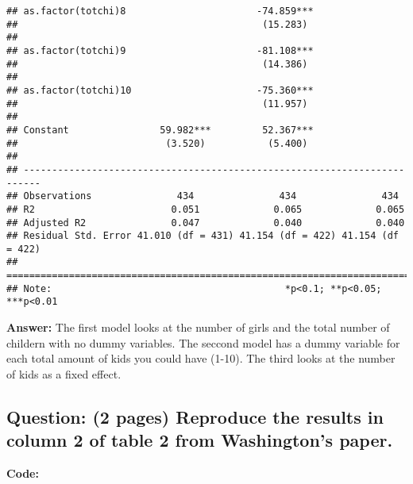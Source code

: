 \documentclass[
]{article}
\begin{document}
\begin{verbatim}
## as.factor(totchi)8                       -74.859***                      
##                                           (15.283)                       
##                                                                          
## as.factor(totchi)9                       -81.108***                      
##                                           (14.386)                       
##                                                                          
## as.factor(totchi)10                      -75.360***                      
##                                           (11.957)                       
##                                                                          
## Constant                59.982***         52.367***                      
##                          (3.520)           (5.400)                       
##                                                                          
## -------------------------------------------------------------------------
## Observations               434               434               434       
## R2                        0.051             0.065             0.065      
## Adjusted R2               0.047             0.040             0.040      
## Residual Std. Error 41.010 (df = 431) 41.154 (df = 422) 41.154 (df = 422)
## =========================================================================
## Note:                                         *p<0.1; **p<0.05; ***p<0.01
\end{verbatim}

\textbf{Answer:} The first model looks at the number of girls and the
total number of childern with no dummy variables. The seccond model has
a dummy variable for each total amount of kids you could have (1-10).
The third looks at the number of kids as a fixed effect.

\clearpage

\hypertarget{question-2-pages-reproduce-the-results-in-column-2-of-table-2-from-washingtons-paper.}{%
\subsection{Question: (2 pages) Reproduce the results in column 2 of
table 2 from Washington's
paper.}\label{question-2-pages-reproduce-the-results-in-column-2-of-table-2-from-washingtons-paper.}}

\textbf{Code:}
\end{document}
